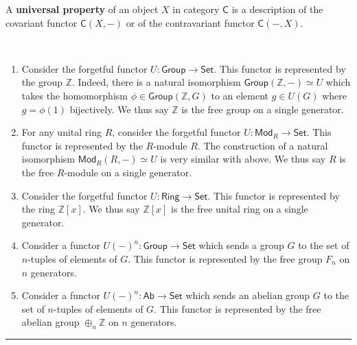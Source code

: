 \begin{defn} A \textbf{universal property} of an object $X$ in category $\mathsf{C}$ is a description of the covariant functor $\mathsf{C}(X,-)$ or of the contravariant functor $\mathsf{C}(-,X)$.
\end{defn}

\begin{exmp}
~\begin{enumerate}
\item Consider the forgetful functor $U:\mathsf{Group}\rightarrow \mathsf{Set}$. This functor is represented by the group $\mathbb{Z}$. Indeed, there is a natural isomorphism $\mathsf{Group}(\mathbb{Z},-)\simeq U$ which takes the homomorphism $\phi\in \mathsf{Group}(\mathbb{Z},G)$ to an element $g\in U(G)$ where $g=\phi(1)$ bijectively. We thus say $\mathbb{Z}$ is the free group on a single generator.
\item For any unital ring $R$, consider the forgetful functor $U:\mathsf{Mod}_R\rightarrow\mathsf{Set}$. This functor is represented by the $R$-module $R$. The construction of a natural isomorphism $\mathsf{Mod}_R(R,-)\simeq U$ is very similar with above. We thus say $R$ is the free $R$-module on a single generator.
\item Consider the forgetful functor $U:\mathsf{Ring}\rightarrow \mathsf{Set}$. This functor is represented by the ring $\mathbb{Z}[x]$. We thus say $\mathbb{Z}[x]$ is the free unital ring on a single generator.
\item Consider a functor $U(-)^n:\mathsf{Group}\rightarrow \mathsf{Set}$ which sends a group $G$ to the set of $n$-tuples of elements of $G$. This functor is represented by the free group $F_n$ on $n$ generators.
\item Consider a functor $U(-)^n:\mathsf{Ab}\rightarrow \mathsf{Set}$ which sends an abelian group $G$ to the set of $n$-tuples of elements of $G$. This functor is represented by the free abelian group $\oplus_n\mathbb{Z}$ on $n$ generators.
\end{enumerate}
\end{exmp}
\noindent\rule{\textwidth}{1pt}
\newline
